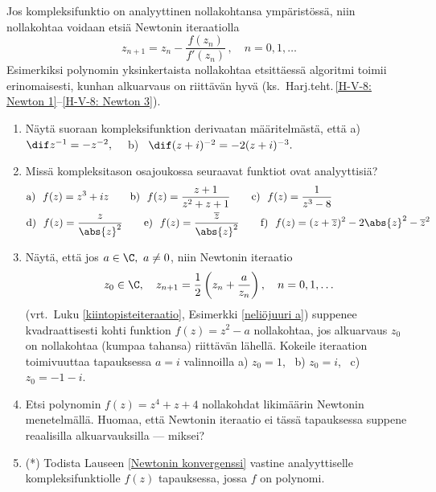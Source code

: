 Jos kompleksifunktio on analyyttinen nollakohtansa ympäristössä, niin nollakohtaa voidaan
etsiä Newtonin iteraatiolla
\[
z_{n+1} = z_n - \frac{f(z_n)}{f'(z_n)}\,, \quad n=0,1,\ldots
\]
Esimerkiksi polynomin yksinkertaista nollakohtaa etsittäessä algoritmi toimii erinomaisesti,
kunhan alkuarvaus on riittävän hyvä
(ks.\ Harj.teht.\,\ref{H-V-8: Newton 1}--\ref{H-V-8: Newton 3}).

\Harj
\begin{enumerate}

\item
Näytä suoraan kompleksifunktion derivaatan määritelmästä, että \newline
a) \ $\dif z^{-1}=-z^{-2},\quad$ b) \ $\dif (z+i)^{-2}=-2(z+i)^{-3}.$

\item
Missä kompleksitason osajoukossa seuraavat funktiot ovat analyyttisiä?
\begin{align*}
&\text{a)}\ \ f(z)=z^3+iz \qquad \text{b)}\ \ f(z)=\frac{z+1}{z^2+z+1} \qquad
 \text{c)}\ \ f(z)=\frac{1}{z^3-8} \\
&\text{d)}\ \ f(z)=\frac{z}{\abs{z}^2} \qquad 
 \text{e)}\ \ f(z)=\frac{\overline{z}}{\abs{z}^2} \qquad
 \text{f)}\ \ f(z)=(z+\overline{z})^2-2\abs{z}^2-\overline{z}^2
\end{align*}

\item \label{H-V-8: Newton 1}
Näytä, että jos $a\in\C,\ a \neq 0$, niin Newtonin iteraatio
\[
z_0\in\C, \quad z_{n+1} = \frac{1}{2}\left(z_n + \frac{a}{z_n}\right), \quad n=0,1,\ldots
\]
(vrt.\ Luku \ref{kiintopisteiteraatio}, Esimerkki \ref{neliöjuuri a}) suppenee kvadraattisesti
kohti funktion $f(z)=z^2-a$ nollakohtaa, jos alkuarvaus $z_0$ on nollakohtaa (kumpaa tahansa)
riittävän lähellä. Kokeile iteraation toimivuuttaa tapauksessa $a=i$ valinnoilla a) $z_0=1$, \
b) $z_0=i$, \ c) $z_0=-1-i$.

\item \label{H-V-8: Newton 2}
Etsi polynomin $f(z)=z^4+z+4$ nollakohdat likimäärin Newtonin menetelmällä. Huomaa, että
Newtonin iteraatio ei tässä tapauksessa suppene reaalisilla alkuarvauksilla --- miksei?

\item (*) \label{H-V-8: Newton 3}
Todista Lauseen \ref{Newtonin konvergenssi} vastine analyyttiselle kompleksifunktiolle
$f(z)$ tapauksessa, jossa $f$ on polynomi.

\end{enumerate}
